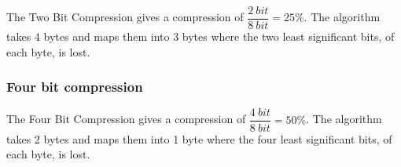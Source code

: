 The Two Bit Compression gives a compression of $\dfrac{2\ bit}{8\ bit} = 25\%$.
The algorithm takes 4 bytes and maps them into 3 bytes where the two least significant bits, of each byte, is lost.

\subsubsection{Four bit compression} %
\label{sub:four_bit_compression}

The Four Bit Compression gives a compression of $\dfrac{4\ bit}{8\ bit} = 50\%$.
The algorithm takes 2 bytes and maps them into 1 byte where the four least significant bits, of each byte, is lost.



